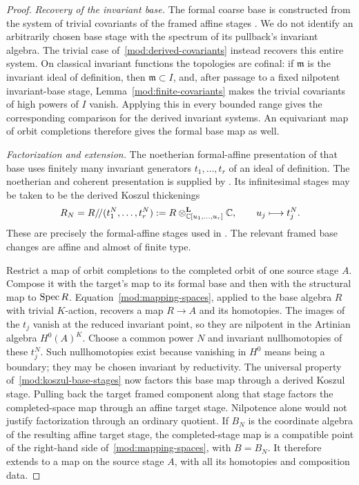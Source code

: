 \begin{proof}
\emph{Recovery of the invariant base.}
The formal coarse base is constructed from the system of trivial
covariants of the framed affine stages
\cite[\S\S5.3.5--5.3.6]{AGKRRV1}. We do not identify an arbitrarily
chosen base stage with the spectrum of its pullback's invariant
algebra. The trivial case of~\eqref{mod:derived-covariants} instead
recovers this entire system. On classical invariant functions the
topologies are cofinal: if $\mathfrak m$ is the invariant ideal of
definition, then $\mathfrak m\subset I$, and, after passage to a
fixed nilpotent invariant-base stage,
Lemma~\ref{mod:finite-covariants} makes the trivial covariants of high
powers of $I$ vanish. Applying this in every bounded range gives the
corresponding comparison for the derived invariant systems.
An equivariant map of orbit completions therefore gives the formal
base map as well.

\emph{Factorization and extension.}
The noetherian formal-affine presentation of that base uses finitely
many invariant generators $t_1,\ldots,t_r$ of an ideal of definition.
The noetherian and coherent presentation is supplied by
\cite[Theorem~A.1.3(b),(c) and Remark~A.1.4]{AGKRRV1}.
Its infinitesimal stages may be taken to be the derived Koszul
thickenings
\begin{equation}
\label{mod:koszul-base-stages}
 R_N=R/\!/(t_1^N,\ldots,t_r^N)
   :=R\otimes_{\mathbb C[u_1,\ldots,u_r]}^{\mathbf L}\mathbb C,
 \qquad u_j\longmapsto t_j^N.
\end{equation}
These are precisely the formal-affine stages used in
\cite[\S7.1 and \S\S7.9.8--7.9.10]{AGKRRV1}. The relevant
framed base changes are affine and almost of finite type.

Restrict a map of orbit completions to the completed orbit of one
source stage $A$. Compose it with the target's map to its formal base
and then with the structural map to $\operatorname{Spec} R$.
Equation~\eqref{mod:mapping-spaces}, applied to the base algebra $R$
with trivial $K$-action, recovers a map $R\to A$ and its homotopies.
The images of the $t_j$ vanish at the reduced invariant point, so
they are nilpotent in the Artinian algebra $H^0(A)^K$. Choose a common power $N$ and invariant nullhomotopies of
these $t_j^N$. Such nullhomotopies exist because vanishing in $H^0$
means being a boundary; they may be chosen invariant by reductivity.
The universal property of~\eqref{mod:koszul-base-stages} now factors
this base map through a derived Koszul stage. Pulling back the target
framed component along that stage factors the completed-space map
through an affine target stage. Nilpotence
alone would not justify factorization through an ordinary quotient.
If $B_N$ is the coordinate algebra of the resulting affine target
stage, the completed-stage map is a compatible point of the
right-hand side of~\eqref{mod:mapping-spaces}, with $B=B_N$.
It therefore extends to a map on the source stage $A$, with all its
homotopies and composition data.


\end{proof}

